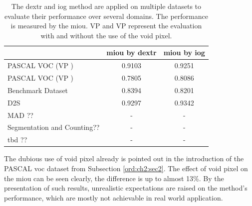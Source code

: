 \begin{table}[h!]
	\centering
	\begin{tabular}{l|c c}
		\toprule 		
									& \gls{miou} by \gls{dextr} &\gls{miou} by \gls{iog}	\\
		\midrule
		PASCAL VOC (VP \cmark)	& 0.9103 	& 0.9251	\\
		PASCAL VOC (VP \xmark)	& 0.7805	& 0.8086	\\
		Benchmark Dataset			& 0.8394 	& 0.8201	\\
		D2S							& 0.9297	& 0.9342	\\
		MAD	??						& - 	& -		\\
		Segmentation and Counting??	& -		& - 	\\
		tbd	??						& -		& - 	\\
		\bottomrule
	\end{tabular}
	\caption[Generalization of IOG and DEXTR]{
		The \gls{dextr} and \gls{iog} method are applied on multiple datasets to evaluate their performance over several domains.
		The performance is measured by the \gls{miou}.
		VP \cmark and VP \xmark \space represent the evaluation with and without the use of the void pixel.
	}\label{tab:ch5:tests_on_datasets}
\end{table}

The dubious use of void pixel already is pointed out in the introduction of the PASCAL \gls{voc} dataset \cite{Eve20-PascalVOC} from Subsection \ref{ord:ch2:sec2}.
The effect of void pixel on the \gls{miou} can be seen clearly, the difference is up to almost 13\%.
By the presentation of such results, unrealistic expectations are raised on the method's performance, which are mostly not achievable in real world application.

